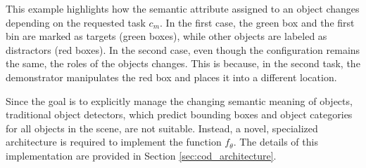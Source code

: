 This example highlights how the semantic attribute assigned to an object changes depending on the requested task $c_{m}$. In the first case, the green box and the first bin are marked as targets (green boxes), while other objects are labeled as distractors (red boxes). In the second case, even though the configuration remains the same, the roles of the objects changes. This is because, in the second task, the demonstrator manipulates the red box and places it into a different location. 

Since the goal is to explicitly manage the changing semantic meaning of objects, traditional object detectors, which predict bounding boxes and object categories for all objects in the scene, are not suitable. Instead, a novel, specialized architecture is required to implement the function $f_{\theta}$. The details of this implementation are provided in Section \ref{sec:cod_architecture}.



